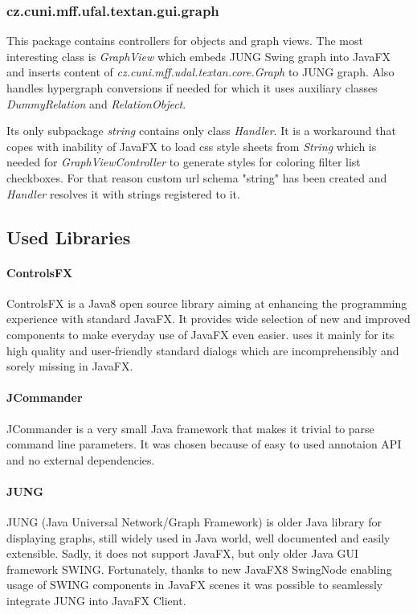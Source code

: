 \subsubsection{cz.cuni.mff.ufal.textan.gui.graph}

This package contains controllers for objects and graph views. The most
interesting class is \emph{GraphView} which embeds JUNG Swing graph into JavaFX
and inserts content of \emph{cz.cuni.mff.udal.textan.core.Graph} to JUNG graph.
Also handles hypergraph conversions if needed for which it uses auxiliary
classes \emph{DummyRelation} and \emph{RelationObject}.

Its only subpackage \emph{string} contains only class \emph{Handler}. It is a
workaround that copes with inability of JavaFX to load css style sheets from
\emph{String} which is needed for \emph{GraphViewController} to generate styles
for coloring filter list checkboxes. For that reason custom url schema "string"
has been created and \emph{Handler} resolves it with strings registered to it.

\subsection{Used Libraries}
\label{ssec:UsedLibraries}


\paragraph{ControlsFX}
ControlsFX is a Java8 open source library aiming at enhancing the programming
experience with standard JavaFX. It provides wide selection of new and improved
components to make everyday use of JavaFX even easier. \textan{} uses it mainly
for its high quality and user-friendly standard dialogs which are
incomprehensibly and sorely missing in JavaFX.

\paragraph{JCommander}
JCommander is a very small Java framework that makes it trivial to parse command
line parameters. It was chosen because of easy to used annotaion API and no
external dependencies.

\paragraph{JUNG}
JUNG (Java Universal Network/Graph Framework) is older Java library for
displaying graphs, still widely used in Java world, well documented and easily
extensible. Sadly, it does not support JavaFX, but only older Java GUI framework
SWING. Fortunately, thanks to new JavaFX8 SwingNode enabling usage of SWING
components in JavaFX scenes it was possible to seamlessly integrate JUNG into
JavaFX \textan{} Client.

